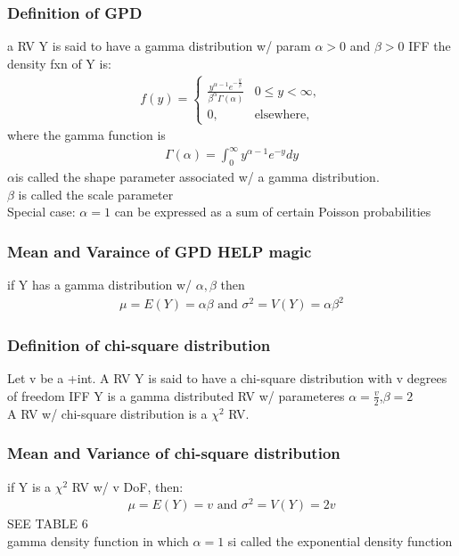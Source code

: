 \documentclass[12pt]{article}
\begin{document}
    \subsubsection{Definition of GPD}
        a RV Y is said to have a gamma distribution w/ param
        $ \alpha > 0 $ and $ \beta > 0 $ IFF the density fxn of Y is:
        \begin{align*}
            f(y) = 
            \begin{cases}
            \frac{y^{\alpha -1}e^{-\frac{y}{\beta }}}
            {\beta ^{\alpha }\Gamma (\alpha )} &
            0 \le y < \infty,\\
            0,& \text{elsewhere,}
            \end{cases}
        \end{align*}
        where the gamma function is
        \begin{align*}
            \Gamma (\alpha ) = \int_{0}^{\infty }y^{\alpha -1}e^{-y}dy
        \end{align*}
        $\alpha   $is called the shape parameter associated w/ a gamma
        distribution.\\
        $ \beta  $ is called the scale parameter\\
        Special case: $ \alpha= 1 $ can be expressed as a sum of
        certain Poisson probabilities
    \subsubsection{Mean and Varaince of GPD HELP magic}
        if Y has a gamma distribution w/ $ \alpha, \beta $ then
        \begin{align*}
            \mu = E(Y) = \alpha\beta \text{ and }
            \sigma^2 = V(Y) = \alpha\beta^2 
        \end{align*}
    \subsubsection{Definition of chi-square distribution}
        Let v be a +int. A RV Y is said to have a chi-square distribution
        with v degrees of freedom IFF Y is a gamma distributed RV
        w/ parameteres $ \alpha= \frac{v}{2} $,$ \beta= 2 $\\
        A RV w/ chi-square distribution is a $ \chi^2  $ RV.
    \subsubsection{Mean and Variance of chi-square distribution}
        if Y is a $ \chi^2  $ RV w/ v DoF, then:
        \begin{align*}
            \mu = E(Y) = v \text{ and } \sigma^2 = V(Y) = 2v
        \end{align*}
        SEE TABLE 6\\
        gamma density function in which $ \alpha= 1 $ si called the 
        exponential density function
\end{document}
